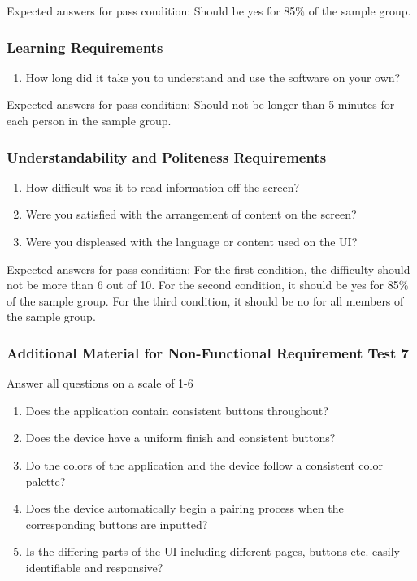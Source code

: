 \documentclass[12pt, titlepage]{article}
\begin{document}
\noindent Expected answers for pass condition: Should be yes for 85\% of the sample group. 


\subsubsection{Learning Requirements}

\begin{enumerate}
\item{How long did it take you to understand and use the software on your own?\\}

\end{enumerate}

\noindent Expected answers for pass condition: Should not be longer than 5 minutes for each person in the sample group. 


\subsubsection{Understandability and Politeness Requirements}

\begin{enumerate}
\item{How difficult was it to read information off the screen?\\}
\item{Were you satisfied with the arrangement of content on the screen?\\}
\item{Were you displeased with the language or content used on the UI?\\}

\end{enumerate}

\noindent Expected answers for pass condition: For the first condition, the difficulty should not be more than 6 out of 10. For the second condition, it should be yes for 85\% of the sample group. For the third condition, it should be no for all members of the sample group.

\subsubsection{Additional Material for Non-Functional Requirement Test 7}
\noindent Answer all questions on a scale of 1-6 
\begin{enumerate}
  \item Does the application contain consistent buttons throughout?
  \item Does the device have a uniform finish and consistent buttons?
  \item Do the colors of the application and the device follow a consistent color palette?
  \item Does the device automatically begin a pairing process when the corresponding buttons are inputted?
  \item Is the differing parts of the UI including different pages, buttons etc. easily identifiable and responsive? 
\end{enumerate}
\end{document}
